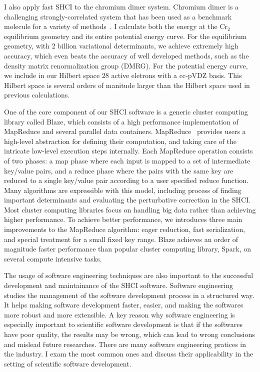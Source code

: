 \documentclass[phd,tocprelim]{cornell}
\begin{document}
I also apply fast SHCI to the chromium dimer system.
Chromium dimer is a challenging strongly-correlated system that has been used as a benchmark molecule for a variety of methods~\cite{Scu-JCP-91,KurYan-JCP-11,PurZhaKra-JCP-15,MaManOlsGag-JCTC-16,VanMalVer-JCTC-16,GuoWatHuSunCha-JCTC-16}.
I calculate both the energy at the Cr$_2$ equilibrium geometry and its entire potential energy curve.
For the equilibrium geometry, with 2 billion variational determinants, we achieve extremely high accuracy, which even beats the accuracy of well developed methods, such as the density matrix renormalization group (DMRG).
For the potential energy curve, we include in our Hilbert space 28 active eletrons with a cc-pVDZ basis.
This Hilbert space is several orders of manitude larger than the Hilbert space used in previous calculations.

One of the core component of our SHCI software is a generic cluster computing library called Blaze, which consists of a high performance implementation of MapReduce and several parallel data containers.
MapReduce~\cite{dean2008mapreduce,dean2010mapreduce} provides users a high-level abstraction for defining their computation, and taking care of the intricate low-level execution steps internally.
Each MapReduce operation consists of two phases: a map phase where each input is mapped to a set of intermediate key/value pairs, and a reduce phase where the pairs with the same key are reduced to a single key/value pair according to a user specified reduce function.
Many algorithms are expressible with this model, including process of finding important determinants and evaluating the perturbative correction in the SHCI.
Most cluster computing libraries focus on handling big data rather than achieving higher performance.
To achieve better performance, we introduces three main improvements to the MapReduce algorithm: eager reduction, fast serialization, and special treatment for a small fixed key range.
Blaze achieves an order of magnitude faster performance than popular cluster computing library, Spark, on several compute intensive tasks.

The usage of software engineering techniques are also important to the successful development and maintainance of the SHCI software.
Software engineering studies the management of the software development process in a structured way.
It helps making software development faster, easier, and making the softwares more robust and more extensible.
A key reason why software engineering is especially important to scientific software development is that if the softwares have poor quality, the results may be wrong, which can lead to wrong conclusions and mislead future researches.
There are many software engineering pratices in the industry.
I exam the most common ones and discuss their applicability in the setting of scientific software development.
\end{document}
